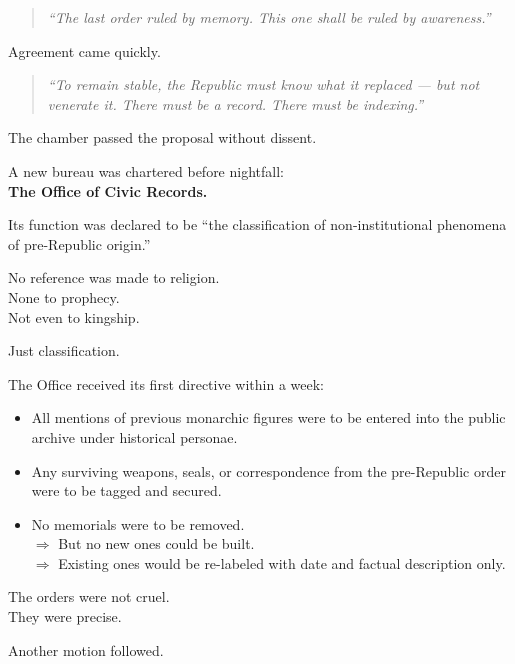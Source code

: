 \documentclass[12pt]{article}
\begin{document}
\begin{quote}
\textit{“The last order ruled by memory. This one shall be ruled by awareness.”}
\end{quote}

Agreement came quickly.

\begin{quote}
\textit{“To remain stable, the Republic must know what it replaced --- but not venerate it. There must be a record. There must be indexing.”}
\end{quote}

The chamber passed the proposal without dissent.

A new bureau was chartered before nightfall:\\
\textbf{The Office of Civic Records.}

Its function was declared to be ``the classification of non-institutional phenomena of pre-Republic origin.''

No reference was made to religion.\\
None to prophecy.\\
Not even to kingship.

Just classification.

\vspace{1em}

The Office received its first directive within a week:

\begin{itemize}
    \item All mentions of previous monarchic figures were to be entered into the public archive under historical personae.
    \item Any surviving weapons, seals, or correspondence from the pre-Republic order were to be tagged and secured.
    \item No memorials were to be removed. \\
        \hspace{1em} $\Rightarrow$ But no new ones could be built. \\
        \hspace{1em} $\Rightarrow$ Existing ones would be re-labeled with date and factual description only.
\end{itemize}

The orders were not cruel.\\
They were precise.

\vspace{1em}

Another motion followed.
\end{document}
